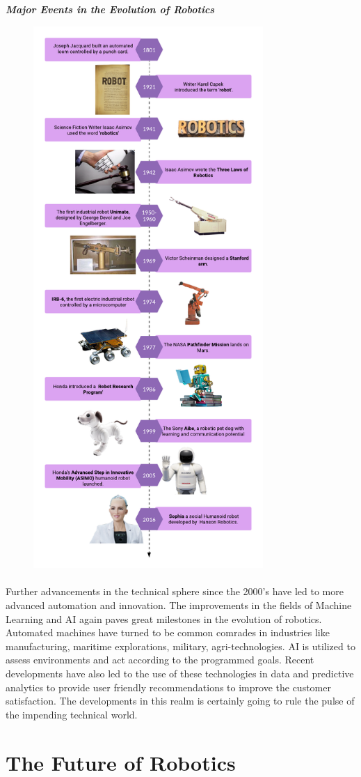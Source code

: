 \newpage
\begin{fullwidth}
    \centering
    \textbf{\textit{Major Events in the Evolution of Robotics}}
     \begin{figure}[h!]
        \centering
        \includegraphics[height=8.1in]{Images/Intro_robotics/Timeline.png}
    \end{figure}
\end{fullwidth}

\paragraph{ } Further advancements in the technical sphere since the 2000's have led to more advanced automation and innovation. The improvements in the fields of Machine Learning and \ac{AI} again paves great milestones in the evolution of robotics. Automated machines have turned to be common comrades in industries like manufacturing, maritime explorations, military, agri-technologies. \ac{AI} is utilized to assess environments and act according to the programmed goals. Recent developments have also led to the use of these technologies in data and predictive analytics to provide user friendly recommendations to improve the customer satisfaction. The developments in this realm is certainly going to rule the pulse of the impending technical world.

\section{The Future of Robotics}
\par 